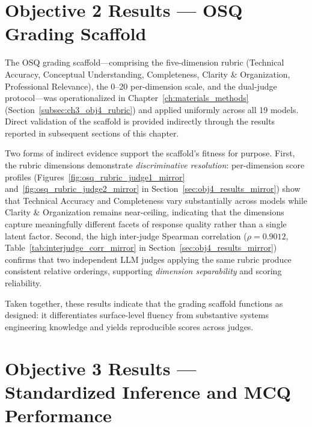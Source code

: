 \section{Objective 2 Results --- OSQ Grading Scaffold}\label{sec:obj2_results_mirror}

The OSQ grading scaffold---comprising the five-dimension rubric (Technical Accuracy, Conceptual Understanding, Completeness, Clarity \& Organization, Professional Relevance), the 0--20 per-dimension scale, and the dual-judge protocol---was operationalized in Chapter~\ref{ch:materials_methods} (Section~\ref{subsec:ch3_obj4_rubric}) and applied uniformly across all 19 models. Direct validation of the scaffold is provided indirectly through the results reported in subsequent sections of this chapter.

Two forms of indirect evidence support the scaffold's fitness for purpose. First, the rubric dimensions demonstrate \emph{discriminative resolution}: per-dimension score profiles (Figures~\ref{fig:osq_rubric_judge1_mirror} and~\ref{fig:osq_rubric_judge2_mirror} in Section~\ref{sec:obj4_results_mirror}) show that Technical Accuracy and Completeness vary substantially across models while Clarity \& Organization remains near-ceiling, indicating that the dimensions capture meaningfully different facets of response quality rather than a single latent factor. Second, the high inter-judge Spearman correlation ($\rho = 0.9012$, Table~\ref{tab:interjudge_corr_mirror} in Section~\ref{sec:obj4_results_mirror}) confirms that two independent LLM judges applying the same rubric produce consistent relative orderings, supporting \emph{dimension separability} and scoring reliability.

Taken together, these results indicate that the grading scaffold functions as designed: it differentiates surface-level fluency from substantive systems engineering knowledge and yields reproducible scores across judges.


\section{Objective 3 Results --- Standardized Inference and MCQ Performance}\label{sec:obj3_results_mirror}


